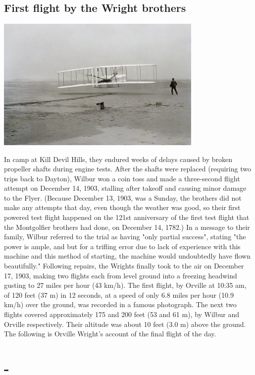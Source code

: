 \documentclass[11pt]{report}
\begin{document}
\subsection{First flight by the Wright brothers}
\vspace{2mm}\begin{center}\includegraphics[width=10cm]{./img/firstflight.jpg}\end{center}
In camp at Kill Devil Hills, they endured weeks of delays caused by broken propeller shafts during engine tests. After the shafts were replaced (requiring two trips back to Dayton), Wilbur won a coin toss and made a three-second flight attempt on December 14, 1903, stalling after takeoff and causing minor damage to the Flyer. (Because December 13, 1903, was a Sunday, the brothers did not make any attempts that day, even though the weather was good, so their first powered test flight happened on the 121st anniversary of the first test flight that the Montgolfier brothers had done, on December 14, 1782.) In a message to their family, Wilbur referred to the trial as having "only partial success", stating "the power is ample, and but for a trifling error due to lack of experience with this machine and this method of starting, the machine would undoubtedly have flown beautifully." Following repairs, the Wrights finally took to the air on December 17, 1903, making two flights each from level ground into a freezing headwind gusting to 27 miles per hour (43 km/h). The first flight, by Orville at 10:35 am, of 120 feet (37 m) in 12 seconds, at a speed of only 6.8 miles per hour (10.9 km/h) over the ground, was recorded in a famous photograph. The next two flights covered approximately 175 and 200 feet (53 and 61 m), by Wilbur and Orville respectively. Their altitude was about 10 feet (3.0 m) above the ground. The following is Orville Wright's account of the final flight of the day.
\section{-}
\end{document}
